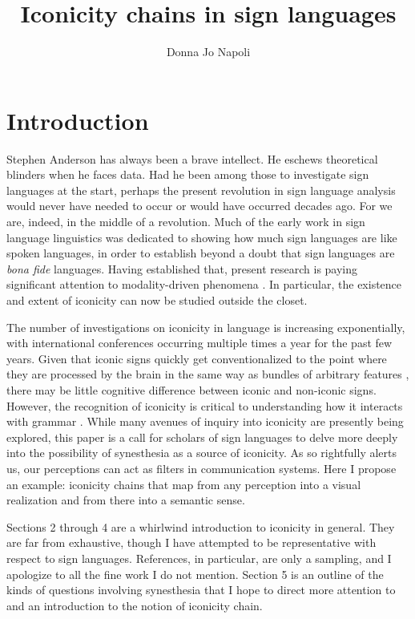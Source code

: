 \documentclass[output=paper,
modfonts
]{LSP/langsci}
\title{Iconicity chains in sign languages}
\author{%
 Donna Jo Napoli\affiliation{Swarthmore College}
}
\begin{document}
\maketitle



\section{Introduction}

Stephen Anderson has always been a brave intellect. He eschews
theoretical blinders when he faces data. Had he been among those to
investigate sign languages at the start, perhaps the present revolution
in sign language analysis would never have needed to occur or would have
occurred decades ago. For we are, indeed, in the middle of a revolution.
Much of the early work in sign language linguistics was dedicated to
showing how much sign languages are like spoken languages, in order to
establish beyond a doubt that sign languages are \emph{bona fide}
languages. Having established that, present research is paying
significant attention to modality-driven phenomena \citep{meier2002,woll2003}. In particular, the existence and extent of iconicity can now be
studied outside the closet.

The number of investigations on iconicity in language is increasing
exponentially, with international conferences occurring multiple times a
year for the past few years. Given that iconic signs quickly get
conventionalized to the point where they are processed by the brain in
the same way as bundles of arbitrary features \citep{emmorey2004,fabisiak2011}, there may be little cognitive difference
between iconic and non-iconic signs. However, the recognition of
iconicity is critical to understanding how it interacts with grammar
\citep{meir2013}. While many avenues of inquiry into iconicity are
presently being explored, this paper is a call for scholars of sign
languages to delve more deeply into the possibility of synesthesia as a
source of iconicity. As \citet{anderson2011,anderson2016} so rightfully alerts us,
our perceptions can act as filters in communication systems. Here I
propose an example: iconicity chains that map from any perception into a
visual realization and from there into a semantic sense.

Sections 2 through 4 are a whirlwind introduction to iconicity in
general. They are far from exhaustive, though I have attempted to be
representative with respect to sign languages. References, in
particular, are only a sampling, and I apologize to all the fine work I
do not mention. Section 5 is an outline of the kinds of questions
involving synesthesia that I hope to direct more attention to and an
introduction to the notion of iconicity chain.
\end{document}
